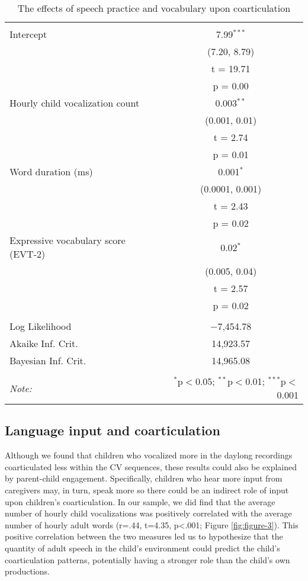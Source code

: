 \documentclass[a4paper,man,natbib,donotrepeattitle, apacite]{apa6}
\begin{document}
\begin{table}[!htbp] \centering 
  \caption{The effects of speech practice and vocabulary upon coarticulation} 
  \label{tab:model-2} 
\begin{tabular}{@{\extracolsep{5pt}}lc} 
\\[-1.8ex]\hline 
\hline \\[-1.8ex] 
 Intercept & 7.99$^{***}$ \\ 
  & (7.20, 8.79) \\ 
  & t = 19.71 \\ 
  & p = 0.00 \\ 
  Hourly child vocalization count & 0.003$^{**}$ \\ 
  & (0.001, 0.01) \\ 
  & t = 2.74 \\ 
  & p = 0.01 \\ 
  Word duration (ms) & 0.001$^{*}$ \\ 
  & (0.0001, 0.001) \\ 
  & t = 2.43 \\ 
  & p = 0.02 \\ 
  Expressive vocabulary score (EVT-2) & 0.02$^{*}$ \\ 
  & (0.005, 0.04) \\ 
  & t = 2.57 \\ 
  & p = 0.02 \\ 
 \hline \\[-1.8ex] 
Log Likelihood & $-$7,454.78 \\ 
Akaike Inf. Crit. & 14,923.57 \\ 
Bayesian Inf. Crit. & 14,965.08 \\ 
\hline 
\hline \\[-1.8ex] 
\textit{Note:}  & \multicolumn{1}{r}{$^{*}$p$<$0.05; $^{**}$p$<$0.01; $^{***}$p$<$0.001} \\ 
\end{tabular} 
\end{table} 


\subsection{Language input and coarticulation}

Although we found that children who vocalized more in the daylong recordings coarticulated less within the CV sequences, these results could also be explained by parent-child engagement. Specifically, children who hear more input from caregivers may, in turn, speak more so there could be an indirect role of input upon children's coarticulation. In our sample, we did find that the average number of hourly child vocalizations was positively correlated with the average number of hourly adult words (r=.44, t=4.35, p<.001; Figure \ref{fig:figure-3}). This positive correlation between the two measures led us to hypothesize that the quantity of adult speech in the child’s environment could predict the child’s coarticulation patterns, potentially having a stronger role than the child’s own productions. 
\end{document}
